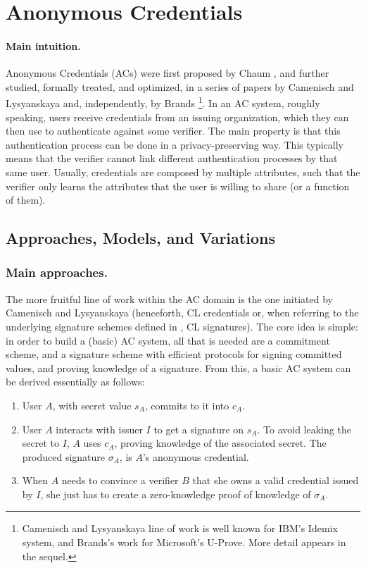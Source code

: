 \section{Anonymous Credentials}
\label{sec:ac}

\paragraph{Main intuition.}
%
Anonymous Credentials (ACs) were first proposed by Chaum \cite{chau85}, and
further studied, formally treated, and optimized, in a series of papers by
Camenisch and Lysyanskaya \cite{cl01,cl02,cl04} and, independently, by Brands
\needcite\footnote{Camenisch and Lysyanskaya line of work is well known for
  IBM's Idemix system, and Brands's work for Microsoft's U-Prove. More detail
  appears in the sequel.}. In an AC system, roughly speaking, users receive
credentials from an issuing organization, which they can then use to
authenticate against some verifier. The main property is that this
authentication process can be done in a privacy-preserving way. This typically
means that the verifier cannot link different authentication processes by that
same user. Usually, credentials are composed by multiple attributes, such that
the verifier only learns the attributes that the user is willing to share (or a
function of them).

\subsection{Approaches, Models, and Variations}
\label{ssec:acapproach}

\subsubsection{Main approaches.}
%
The more fruitful line of work within the AC domain is the one initiated by
Camenisch and Lysyanskaya \cite{cl01,cl02,cl04} (henceforth, CL credentials or,
when referring to the underlying signature schemes defined in \cite{cl02,cl04},
CL signatures). The core idea is simple: in order to build a (basic) AC
system, all that is needed are a commitment scheme, and a signature scheme
with efficient protocols for signing committed values, and proving knowledge
of a signature. From this, a basic AC system can be derived essentially as
follows:

\begin{enumerate}
\item User $A$, with secret value $s_A$, commits to it into $c_A$.
\item User $A$ interacts with issuer $I$ to get a signature on $s_A$. To
  avoid leaking the secret to $I$, $A$ uses $c_A$, proving knowledge of the
  associated secret. The produced signature $\sigma_A$, is $A$'s anonymous
  credential.
\item When $A$ needs to convince a verifier $B$ that she owns a valid credential
  issued by $I$, she just has to create a zero-knowledge proof of knowledge
  of $\sigma_A$.
\end{enumerate}

